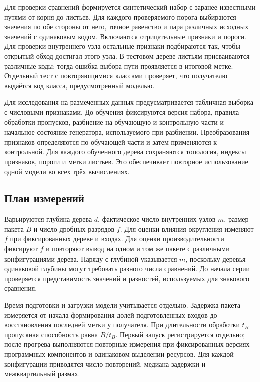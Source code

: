 Для проверки сравнений формируется синтетический набор с заранее
известными путями от корня до листьев. Для каждого проверяемого порога
выбираются значения по обе стороны от него, точное равенство и пара
различных исходных значений с одинаковым кодом. Включаются отрицательные
признаки и пороги. Для проверки внутреннего узла остальные признаки
подбираются так, чтобы открытый обход достигал этого узла. В тестовом
дереве листьям присваиваются различные коды: тогда ошибка выбора пути
проявляется в итоговой метке. Отдельный тест с повторяющимися классами
проверяет, что получателю выдаётся код класса, предусмотренный моделью.

Для исследования на размеченных данных предусматривается табличная
выборка с числовыми признаками. До обучения фиксируются версия набора,
правила обработки пропусков, разбиение на обучающую и контрольную части
и начальное состояние генератора, используемого при разбиении.
Преобразования признаков определяются по обучающей части и затем
применяются к контрольной. Для каждого обученного дерева сохраняются
топология, индексы признаков, пороги и метки листьев. Это обеспечивает
повторное использование одной модели во всех трёх вычислениях.

\subsection{План измерений}

Варьируются глубина дерева $d$, фактическое число внутренних узлов $m$,
размер пакета $B$ и число дробных разрядов $f$. Для оценки влияния
округления изменяют $f$ при фиксированных дереве и входах. Для оценки
производительности фиксируют $f$ и повторяют вывод на одном и том же
пакете с различными конфигурациями дерева. Наряду с глубиной указывается
$m$, поскольку деревья одинаковой глубины могут требовать разного числа
сравнений. До начала серии проверяется представимость значений и разностей,
используемых для знакового сравнения.

Время подготовки и загрузки модели учитывается отдельно. Задержка пакета
измеряется от начала формирования долей подготовленных входов до
восстановления последней метки у получателя. При длительности обработки
$t_B$ пропускная способность равна $B/t_B$. Первый запуск регистрируется
отдельно; после прогрева выполняются повторные измерения при фиксированных
версиях программных компонентов и одинаковом выделении ресурсов.
Для каждой конфигурации приводятся число повторений, медиана задержки
и межквартильный размах.

